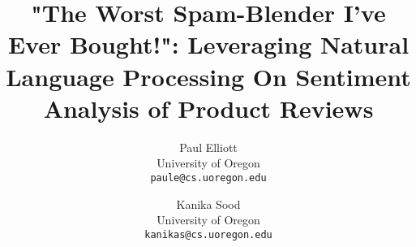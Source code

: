 \documentclass[conference,10pt]{IEEEtran}
\date{}
\begin{document}
\setcounter{page}{1}
\pagestyle{plain}


\title{"The Worst Spam-Blender I've Ever Bought!": Leveraging Natural Language Processing On Sentiment Analysis of Product Reviews}
\author{
{Paul Elliott}\\
University of Oregon\\
\texttt{paule@cs.uoregon.edu}
\and
{Kanika Sood}\\
University of Oregon\\
\texttt{kanikas@cs.uoregon.edu}
}

\maketitle


\end{document}
